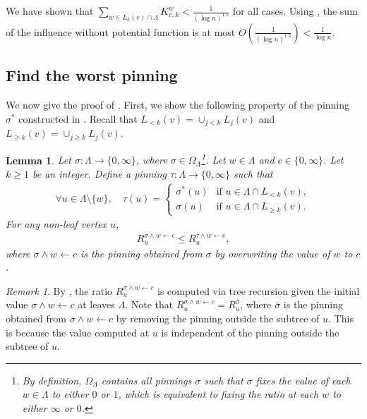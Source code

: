 \documentclass[11pt]{amsart}
\newtheorem{lemma}[theorem]{Lemma}
\theoremstyle{definition}
\theoremstyle{remark}
\newtheorem*{remark}{Remark}
\begin{document}
We have shown that $\sum_{w\in L_k(v) \cap \Lambda}K_{v,k}^{w} < \frac{1}{(\log n)^{1.5}}$ for all cases. Using , the sum of the influence without potential function is at most $O\left(\frac{1}{(\log n)^{1.5}}\right) < \frac{1}{\log n}$.

\subsection{Find the worst pinning}\label{subsec:proof-of-lemma:monotone-potential}

We now give the proof of .
First, we show the following property of the pinning $\sigma^*$ constructed in .
Recall that $L_{<k}(v) = \cup_{j < k} L_j(v)$ and $L_{\geq k}(v) = \cup_{j \geq k} L_j(v)$.

\begin{lemma}\label{lem:sigma-star-property}
Let $\sigma: \Lambda \to \{0,\infty\}$, where $\sigma \in \Omega_\Lambda$\footnote{By definition, $\Omega_\Lambda$ contains all pinnings $\sigma$ such that $\sigma$ fixes the value of each $w \in \Lambda$ to either $0$ or $1$, which is equivalent to fixing the ratio at each $w$ to either $\infty$ or $0$.}.
Let $w \in \Lambda$ and $c \in \{0,\infty\}$.
Let $k \geq 1$ be an integer. 
Define a pinning $\tau: \Lambda \to \{0,\infty\}$ such that
\begin{align*}
\forall u \in \Lambda \setminus \{w\}, \quad \tau(u) = \begin{cases}
\sigma^*(u) & \text{if } u \in \Lambda \cap L_{<k}(v),\\
\sigma(u) & \text{if } u \in \Lambda \cap L_{\geq k}(v).
\end{cases}
\end{align*}
For any non-leaf vertex $u$,
\begin{align*}
R^{\sigma \land w \gets c}_u \leq R^{\tau \land w \gets c}_u,
\end{align*}
where $\sigma \land w \gets c$ is the pinning obtained from $\sigma$ by overwriting the value of $w$ to $c$.
\end{lemma}

\begin{remark}
By , the ratio
$R^{\sigma \land w \gets c}_u$ is computed via tree recursion given the initial value $\sigma \land w \gets c$ at leaves $\Lambda$. Note that $R^{\sigma \land w \gets c}_u = R^{\bar{\sigma}}_u$, where $\bar{\sigma}$ is the pinning obtained from $\sigma \land w \gets c$ by removing the pinning outside the subtree of $u$.
This is because the value computed at $u$ is independent of the pinning outside the subtree of $u$.
\end{remark}
\end{document}
